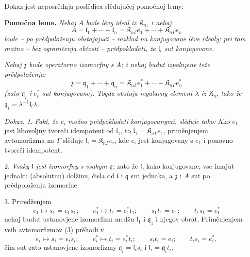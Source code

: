 \documentclass[11pt]{article}
\begin{document}
Dokaz jest neposrědnja poslědica slědujučej pomočnoj lemy:

\textbf{Pomočna lema.} \emph{Nehaj \(A\) bude lěvy ideal iz \(\mathfrak K_n\), i nehaj}
\[
A=\mathfrak l_1+\cdots+\mathfrak l_n
=\mathfrak K_{n\Gamma}e_1+\cdots+\mathfrak K_{n\Gamma}e_n
\]
\emph{bude -- po prědpoloženju obstajajuči -- razklad na konjugovane lěve idealy; pri tom možno -- bez ograničenja občosti -- prědpokladati, že \(\mathfrak l_i\) sut konjugovane.}

\emph{Nehaj \(\mathfrak z\) bude operatorno izomorfny s \(A\); i nehaj budut izpolnjene teže prědpoloženja:}
\[
\mathfrak z=\mathfrak q_1+\cdots+\mathfrak q_n
=\mathfrak K_{n\Gamma}e_1^*+\cdots+\mathfrak K_{n\Gamma}e_n^*
\]
\emph{(zato \(\mathfrak q_i\) i \(e_i^*\) sut konjugovane). Togda obstaja regularny element \(\lambda\) iz \(\mathfrak K_n\), tako že \(\mathfrak q_i=\lambda^{-1}\mathfrak l_i\lambda\).}

\emph{Dokaz. 1. Fakt, že \(e_i\) možno prědpokladati konjugovanymi, slěduje tako:} Ako \(e_1\) jest libovoljny tvoreči idempotent od \(\mathfrak l_1\), to \(\mathfrak l_1=\mathfrak K_{n\Gamma}e_1\), priměnjenjem avtomorfizma na \(\Gamma\) slěduje \(\mathfrak l_i=\mathfrak K_{n\Gamma}e_i\), kde \(e_i\) jest konjugovany s \(e_1\) i ponovno tvoreči idempotent.

2. \emph{Vsaky \(\mathfrak l\) jest izomorfny s vsakym \(\mathfrak q\);} zato že \(\mathfrak l\), kako konjugovane, vse imajut jednaku (absolutnu) dolžinu, čisla od \(\mathfrak l\) i \(\mathfrak q\) sut jednaka, a \(\mathfrak z\) i \(A\) sut po prědpoloženju izomorfne.

3. Priredženjem
\[
\tag{3}
e_1\mapsto s_1=e_1s_1;\qquad
e_1^*\mapsto t_1=e_1^*t_1;\qquad
s_1t_1=e_1;\qquad
t_1s_1=e_1^*
\]
nehaj budut ustanovjene izomorfizm medžu \(\mathfrak l_1\) i \(\mathfrak q_1\) i njegov obrat. Priměnjenjem vsih avtomorfizmov (3) prěhodi v
\[
e_i\mapsto s_i=e_is_i;\qquad
e_i^*\mapsto t_i=e_i^*t_i;\qquad
s_it_i=e_i;\qquad
t_is_i=e_i^*,
\]
čim sut zato ustanovjene izomorfizmy \(\mathfrak q_i=\mathfrak l_is_i\) i \(\mathfrak l_i=\mathfrak q_it_i\).
\end{document}
